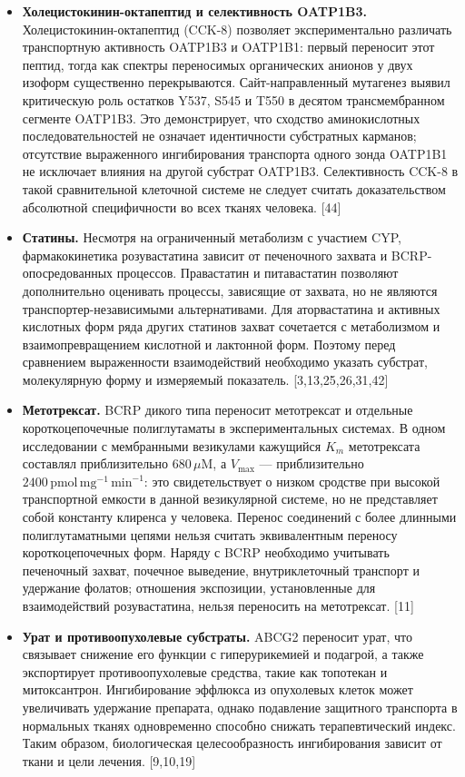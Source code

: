\documentclass[11pt]{article}
\begin{document}
\begin{itemize}
\item \textbf{Холецистокинин-октапептид и селективность OATP1B3.} Холецистокинин-октапептид (CCK-8) позволяет экспериментально различать транспортную активность OATP1B3 и OATP1B1: первый переносит этот пептид, тогда как спектры переносимых органических анионов у двух изоформ существенно перекрываются. Сайт-направленный мутагенез выявил критическую роль остатков Y537, S545 и T550 в десятом трансмембранном сегменте OATP1B3. Это демонстрирует, что сходство аминокислотных последовательностей не означает идентичности субстратных карманов; отсутствие выраженного ингибирования транспорта одного зонда OATP1B1 не исключает влияния на другой субстрат OATP1B3. Селективность CCK-8 в такой сравнительной клеточной системе не следует считать доказательством абсолютной специфичности во всех тканях человека. [44]
\item \textbf{Статины.} Несмотря на ограниченный метаболизм с участием CYP, фармакокинетика розувастатина зависит от печеночного захвата и BCRP-опосредованных процессов. Правастатин и питавастатин позволяют дополнительно оценивать процессы, зависящие от захвата, но не являются транспортер-независимыми альтернативами. Для аторвастатина и активных кислотных форм ряда других статинов захват сочетается с метаболизмом и взаимопревращением кислотной и лактонной форм. Поэтому перед сравнением выраженности взаимодействий необходимо указать субстрат, молекулярную форму и измеряемый показатель. [3,13,25,26,31,42]
\item \textbf{Метотрексат.} BCRP дикого типа переносит метотрексат и отдельные короткоцепочечные полиглутаматы в экспериментальных системах. В одном исследовании с мембранными везикулами кажущийся \(K_m\) метотрексата составлял приблизительно \(680\,\mu\mathrm{M}\), а \(V_{\max}\) --- приблизительно \(2400\,\mathrm{pmol}\,\mathrm{mg}^{-1}\,\mathrm{min}^{-1}\): это свидетельствует о низком сродстве при высокой транспортной емкости в данной везикулярной системе, но не представляет собой константу клиренса у человека. Перенос соединений с более длинными полиглутаматными цепями нельзя считать эквивалентным переносу короткоцепочечных форм. Наряду с BCRP необходимо учитывать печеночный захват, почечное выведение, внутриклеточный транспорт и удержание фолатов; отношения экспозиции, установленные для взаимодействий розувастатина, нельзя переносить на метотрексат. [11]
\item \textbf{Урат и противоопухолевые субстраты.} ABCG2 переносит урат, что связывает снижение его функции с гиперурикемией и подагрой, а также экспортирует противоопухолевые средства, такие как топотекан и митоксантрон. Ингибирование эффлюкса из опухолевых клеток может увеличивать удержание препарата, однако подавление защитного транспорта в нормальных тканях одновременно способно снижать терапевтический индекс. Таким образом, биологическая целесообразность ингибирования зависит от ткани и цели лечения. [9,10,19]
\end{itemize}
\end{document}
